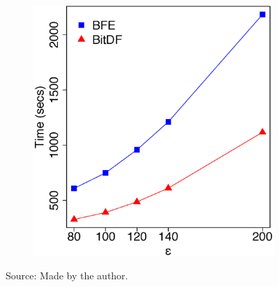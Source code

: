 {\begin{figure}[h!]
\begin{subfigure}[t]{0.48\textwidth}
        \includegraphics[width=\textwidth]{images/BerlinMOD_n_4_l_8_varying_g.eps}
        \label{fig:berlinmod_vary_g}
    \end{subfigure}
    \footnotesize{Source: Made by the author.}
    \label{fig:berlinmod_results}
\end{figure}

}

